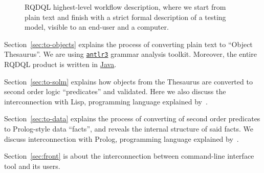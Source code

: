 \documentclass[12pt,oneside,letterpaper]{article}
\begin{document}
    \begin{figure}[ht]
        \centering
        \caption{RQDQL highest-level workflow description, where we start
            from plain text and finish with a strict formal description
            of a testing model, visible to an end-user and a computer.}
        \label{fig:Workflow}
    \end{figure}

    Section~\ref{sec:to-objects} explains the process of converting plain text
    to ``Object Thesaurus''. We are using
    \href{http://www.altlr.org}{\texttt{antlr3}} grammar analysis toolkit.
    Moreover, the entire RQDQL product is written in \href{http://www.java.com/en/}{Java}.

    Section~\ref{sec:to-solm} explains how objects from the Thesaurus are converted to
    second order logic ``predicates''
    and validated. Here we also discuss the interconnection with
    Lisp, programming language explained by~\cite{graham93}.

    Section~\ref{sec:to-data} explains the process of converting of
    second order predicates to Prolog-style data ``facts'', and reveals the internal
    structure of said facts. We discuss interconnection with Prolog,
    programming language explained by~\cite{shapiro94}.

    Section~\ref{sec:front} is about the interconnection between 
    command-line interface tool and its users.
\end{document}
